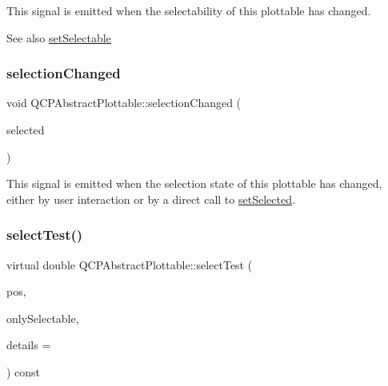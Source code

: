 This signal is emitted when the selectability of this plottable has changed.

\begin{DoxySeeAlso}{See also}
\mbox{\hyperlink{class_q_c_p_abstract_plottable_a22c69299eb5569e0f6bf084877a37dc4}{set\+Selectable}} 
\end{DoxySeeAlso}
\mbox{\label{class_q_c_p_abstract_plottable_a3af66432b1dca93b28e00e78a8c7c1d9}} 
\subsubsection{\texorpdfstring{selection\+Changed}{selectionChanged}}
{\footnotesize\ttfamily void Q\+C\+P\+Abstract\+Plottable\+::selection\+Changed (\begin{DoxyParamCaption}\item[{bool}]{selected }\end{DoxyParamCaption})\hspace{0.3cm}{\ttfamily [signal]}}

This signal is emitted when the selection state of this plottable has changed, either by user interaction or by a direct call to \mbox{\hyperlink{class_q_c_p_abstract_plottable_afbd5428c2952f59d952e11ab5cd79176}{set\+Selected}}. \mbox{\label{class_q_c_p_abstract_plottable_a38efe9641d972992a3d44204bc80ec1d}} 
\subsubsection{\texorpdfstring{select\+Test()}{selectTest()}}
{\footnotesize\ttfamily virtual double Q\+C\+P\+Abstract\+Plottable\+::select\+Test (\begin{DoxyParamCaption}\item[{const Q\+PointF \&}]{pos,  }\item[{bool}]{only\+Selectable,  }\item[{Q\+Variant $\ast$}]{details = {} }\end{DoxyParamCaption}) const\hspace{0.3cm}{\ttfamily [pure virtual]}}

